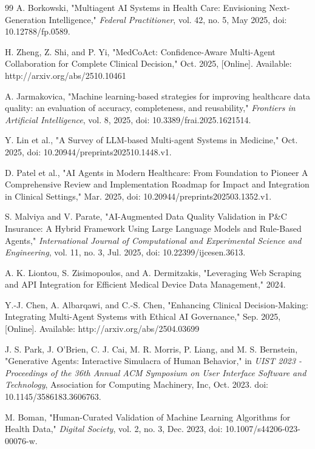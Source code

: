 \documentclass[conference]{IEEEtran}
\begin{document}
\begin{thebibliography}{99}
A. Borkowski, "Multiagent AI Systems in Health Care: Envisioning Next-Generation Intelligence," \textit{Federal Practitioner}, vol. 42, no. 5, May 2025, doi: 10.12788/fp.0589.

H. Zheng, Z. Shi, and P. Yi, "MedCoAct: Confidence-Aware Multi-Agent Collaboration for Complete Clinical Decision," Oct. 2025, [Online]. Available: http://arxiv.org/abs/2510.10461

A. Jarmakovica, "Machine learning-based strategies for improving healthcare data quality: an evaluation of accuracy, completeness, and reusability," \textit{Frontiers in Artificial Intelligence}, vol. 8, 2025, doi: 10.3389/frai.2025.1621514.

Y. Lin et al., "A Survey of LLM-based Multi-agent Systems in Medicine," Oct. 2025, doi: 10.20944/preprints202510.1448.v1.

D. Patel et al., "AI Agents in Modern Healthcare: From Foundation to Pioneer  A Comprehensive Review and Implementation Roadmap for Impact and Integration in Clinical Settings," Mar. 2025, doi: 10.20944/preprints202503.1352.v1.

S. Malviya and V. Parate, "AI-Augmented Data Quality Validation in P\&C Insurance: A Hybrid Framework Using Large Language Models and Rule-Based Agents," \textit{International Journal of Computational and Experimental Science and Engineering}, vol. 11, no. 3, Jul. 2025, doi: 10.22399/ijcesen.3613.

A. K. Liontou, S. Zisimopoulos, and A. Dermitzakis, "Leveraging Web Scraping and API Integration for Efficient Medical Device Data Management," 2024.

Y.-J. Chen, A. Albarqawi, and C.-S. Chen, "Enhancing Clinical Decision-Making: Integrating Multi-Agent Systems with Ethical AI Governance," Sep. 2025, [Online]. Available: http://arxiv.org/abs/2504.03699

J. S. Park, J. O'Brien, C. J. Cai, M. R. Morris, P. Liang, and M. S. Bernstein, "Generative Agents: Interactive Simulacra of Human Behavior," in \textit{UIST 2023 - Proceedings of the 36th Annual ACM Symposium on User Interface Software and Technology}, Association for Computing Machinery, Inc, Oct. 2023. doi: 10.1145/3586183.3606763.

M. Boman, "Human-Curated Validation of Machine Learning Algorithms for Health Data," \textit{Digital Society}, vol. 2, no. 3, Dec. 2023, doi: 10.1007/s44206-023-00076-w.


\end{thebibliography}
\end{document}
